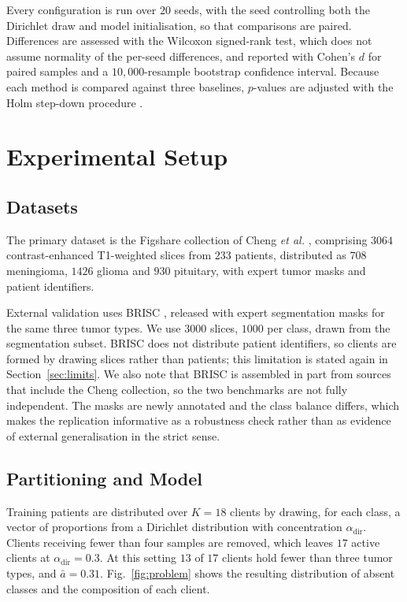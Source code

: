 \documentclass[journal]{IEEEtran}
\begin{document}
Every configuration is run over $20$ seeds, with the seed controlling both the
Dirichlet draw and model initialisation, so that comparisons are paired.
Differences are assessed with the Wilcoxon signed-rank test, which does not
assume normality of the per-seed differences, and reported with Cohen's $d$ for
paired samples and a $10{,}000$-resample bootstrap confidence interval. Because
each method is compared against three baselines, $p$-values are adjusted with
the Holm step-down procedure \cite{holm1979}.

\section{Experimental Setup}

\subsection{Datasets}
The primary dataset is the Figshare collection of Cheng \emph{et al.}
\cite{cheng2015}, comprising $3064$ contrast-enhanced T1-weighted slices from
$233$ patients, distributed as $708$ meningioma, $1426$ glioma and $930$
pituitary, with expert tumor masks and patient identifiers.

External validation uses BRISC \cite{brisc2025}, released with expert
segmentation masks for the same three tumor types. We use $3000$ slices,
$1000$ per class, drawn from the segmentation subset. BRISC does not distribute
patient identifiers, so clients are formed by drawing slices rather than
patients; this limitation is stated again in Section~\ref{sec:limits}. We also
note that BRISC is assembled in part from sources that include the Cheng
collection, so the two benchmarks are not fully independent. The masks are newly
annotated and the class balance differs, which makes the replication informative
as a robustness check rather than as evidence of external generalisation in the
strict sense.

\subsection{Partitioning and Model}
Training patients are distributed over $K = 18$ clients by drawing, for each
class, a vector of proportions from a Dirichlet distribution with concentration
$\alpha_{\mathrm{dir}}$. Clients receiving fewer than four samples are removed,
which leaves $17$ active clients at $\alpha_{\mathrm{dir}} = 0.3$. At this
setting $13$ of $17$ clients hold fewer than three tumor types, and $\bar{a} =
0.31$. Fig.~\ref{fig:problem} shows the resulting distribution of absent classes
and the composition of each client.
\end{document}
